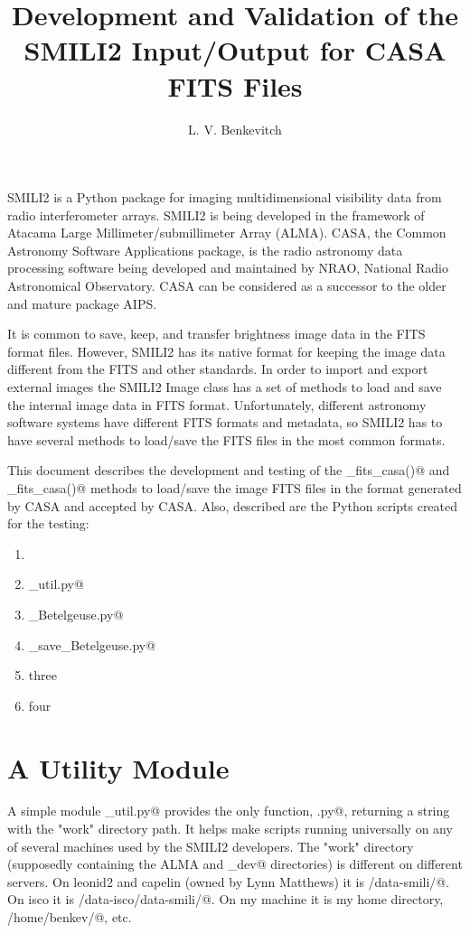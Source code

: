 \documentclass[preprint]{aastex}
\begin{document}
\title{Development and Validation of the SMILI2 Input/Output for CASA FITS Files}

\author{L. V. Benkevitch}

SMILI2 is a Python package for imaging multidimensional visibility data from radio interferometer arrays. SMILI2 is being developed in the framework of Atacama Large Millimeter/submillimeter Array (ALMA). CASA, the Common Astronomy Software Applications package, is the radio astronomy data processing software being developed and maintained by NRAO, National Radio Astronomical Observatory. CASA can be considered as a successor to the older and mature package AIPS. 

It is common to save, keep, and transfer brightness image data in the FITS format files. However, SMILI2 has its native format for keeping the image data different from the FITS and other standards. In order to import and export external images the SMILI2 Image class has a set of methods to load and save the internal image data in FITS format. Unfortunately, different astronomy software systems have different FITS formats and metadata, so SMILI2 has to have several methods to load/save the FITS files in the most common formats.

This document describes the development and testing of the \verb@load_fits_casa()@ and \verb@to_fits_casa()@ methods to load/save the image FITS files in the format generated by CASA and accepted by CASA. Also, described are the Python scripts created for the testing: 

\begin{enumerate}
  \item \verb@@
  \item \verb@alma_util.py@
  \item \verb@RoundSpottyDisk_Betelgeuse.py@
  \item \verb@load_save_Betelgeuse.py@
  \item three
  \item four
\end{enumerate}


\section{A Utility Module}

A simple module \verb@alma_util.py@ provides the only function, \verb@workdir.py@, returning a string with the "work" directory path. It helps make scripts running universally on any of several machines used by the SMILI2 developers. The "work" directory (supposedly containing the ALMA and _dev@ directories) is different on different servers. On leonid2 and capelin (owned by Lynn Matthews) it is \verb@/data-smili/@. On isco it is \verb@/data-isco/data-smili/@. On my machine it is my home directory, \verb@/home/benkev/@, etc. 
\end{document}
